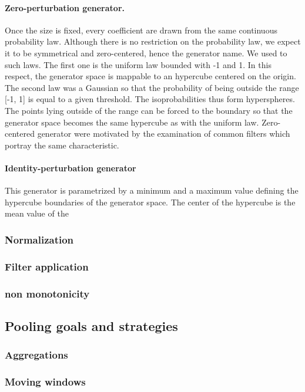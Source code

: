 \documentclass[a4paper]{report}
\begin{document}
			\paragraph{Zero-perturbation generator.}
			Once the size is fixed, every coefficient are drawn from the same continuous probability law. Although there is no restriction on the probability law, we expect it to be symmetrical and zero-centered, hence the generator name. We used to such laws. The first one is the uniform law bounded with -1 and 1. In this respect, the generator space is mappable to an hypercube centered on the origin. The second law was a Gaussian so that the probability of being outside the range [-1, 1] is equal to a given threshold. The isoprobabilities thus form hyperspheres. The points lying outside of the range can be forced to the boundary so that the generator space becomes the same hypercube as with the uniform law. 
			Zero-centered generator were motivated by the examination of common filters which portray the same characteristic.
			\paragraph{Identity-perturbation generator}
			
			
			This generator is parametrized by a minimum and a maximum value defining the hypercube boundaries of the generator space. The center of the hypercube is the mean value of the 
			
			\subsubsection{Normalization}
			\subsubsection{Filter application}%
			\subsubsection{non monotonicity}
		\subsection{Pooling goals and strategies}
			\subsubsection{Aggregations}
			\subsubsection{Moving windows}
\end{document}
